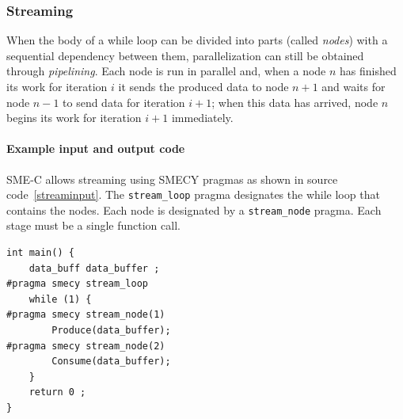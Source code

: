 \documentclass[a4paper]{article}
\begin{document}
	\subsubsection{Streaming}
	When the body of a while loop can be divided into parts (called \emph{nodes}) with a sequential dependency between them, parallelization can still be obtained through \emph{pipelining}. Each node is run in parallel and, when a node $n$ has finished its work for iteration $i$ it sends the produced data to node $n+1$ and waits for node $n-1$ to send data for iteration $i+1$; when this data has arrived, node $n$ begins its work for iteration $i+1$ immediately.
	
	\paragraph{Example input and output code}
	SME-C allows streaming using SMECY pragmas as shown in source code~\ref{streaminput}. The \verb+stream_loop+ pragma designates the while loop that contains the nodes. Each node is designated by a \verb+stream_node+ pragma. Each stage must be a single function call.
	
	\begin{lstlisting}[label=streaminput,caption={Input code with
streaming pragmas. The definitions of \texttt{Produce} and \texttt{Consume} functions are not shown.}]
int main() {
	data_buff data_buffer ;
#pragma smecy stream_loop
	while (1) {
#pragma smecy stream_node(1)
		Produce(data_buffer);
#pragma smecy stream_node(2)
		Consume(data_buffer);
	}
	return 0 ;
}
	\end{lstlisting}
	
\end{document}
